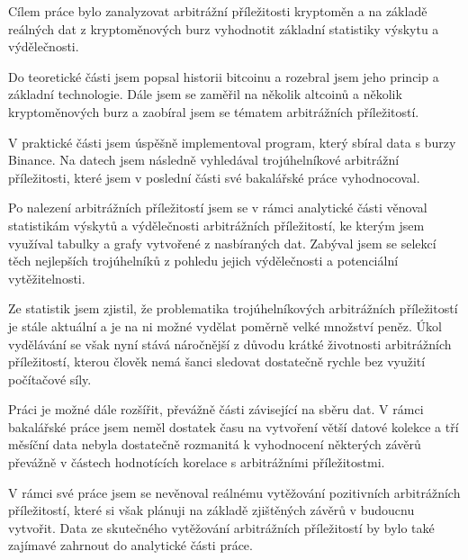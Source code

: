 \documentclass[thesis=B,czech]{FITthesis}[2019/03/21]
\begin{document}
\begin{conclusion}
Cílem práce bylo zanalyzovat arbitrážní příležitosti kryptoměn a na základě reálných dat z kryptoměnových burz vyhodnotit základní statistiky výskytu a výdělečnosti.

Do teoretické části jsem popsal historii bitcoinu a rozebral jsem jeho princip a základní technologie. Dále jsem se zaměřil na několik altcoinů a několik kryptoměnových burz a zaobíral jsem se tématem arbitrážních příležitostí. 

V praktické části jsem úspěšně implementoval program, který sbíral data s burzy Binance. Na datech jsem následně vyhledával trojúhelníkové arbitrážní příležitosti, které jsem v poslední části své bakalářské práce vyhodnocoval. 

Po nalezení arbitrážních příležitostí jsem se v rámci analytické části věnoval statistikám výskytů a výdělečnosti arbitrážních příležitostí, ke kterým jsem využíval tabulky a grafy vytvořené z nasbíraných dat. Zabýval jsem se selekcí těch nejlepších trojúhelníků z pohledu jejich výdělečnosti a potenciální vytěžitelnosti.

Ze statistik jsem zjistil, že problematika trojúhelníkových arbitrážních příležitostí je stále aktuální a je na ni možné vydělat poměrně velké množství peněz. Úkol vydělávání se však nyní stává náročnější z důvodu krátké životnosti arbitrážních příležitostí, kterou člověk nemá šanci sledovat dostatečně rychle bez využití počítačové síly.

Práci je možné dále rozšířit, převážně části závisející na sběru dat. V rámci bakalářské práce jsem neměl dostatek času na vytvoření větší datové kolekce a tří měsíční data nebyla dostatečně rozmanitá k vyhodnocení některých závěrů převážně v částech hodnotících korelace s arbitrážními příležitostmi.

V rámci své práce jsem se nevěnoval reálnému vytěžování pozitivních arbitrážních příležitostí, které si však plánuji na základě zjištěných závěrů v budoucnu vytvořit. Data ze skutečného vytěžování arbitrážních příležitostí by bylo také zajímavé zahrnout do analytické části práce.

\end{conclusion}




\appendix
\end{document}
